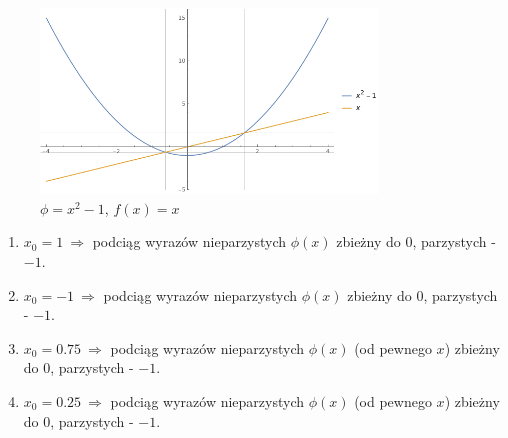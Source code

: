\documentclass{classrep}
\begin{document}
		\begin{figure}[htbp]
			\centering
			\includegraphics[width=0.8\textwidth]{zad6/Myplot2.png}
  			\caption{$\phi=x^2-1$, $f(x)=x$}
  			\label{fig:5}
		\end{figure}
		
		\begin{enumerate}[1.]
			\item $x_0 = 1 ~\Rightarrow$ podciąg wyrazów nieparzystych $\phi(x)$ zbieżny do $0$, parzystych - $-1$.
			\item $x_0 = -1 ~\Rightarrow$ podciąg wyrazów nieparzystych $\phi(x)$ zbieżny do $0$, parzystych - $-1$.
			\item $x_0 = 0.75 ~\Rightarrow$ podciąg wyrazów nieparzystych $\phi(x)$ (od pewnego $x$) zbieżny do $0$, parzystych - $-1$.
			\item $x_0 = 0.25 ~\Rightarrow$ podciąg wyrazów nieparzystych $\phi(x)$ (od pewnego $x$) zbieżny do $0$, parzystych - $-1$.
		\end{enumerate}
\end{document}
